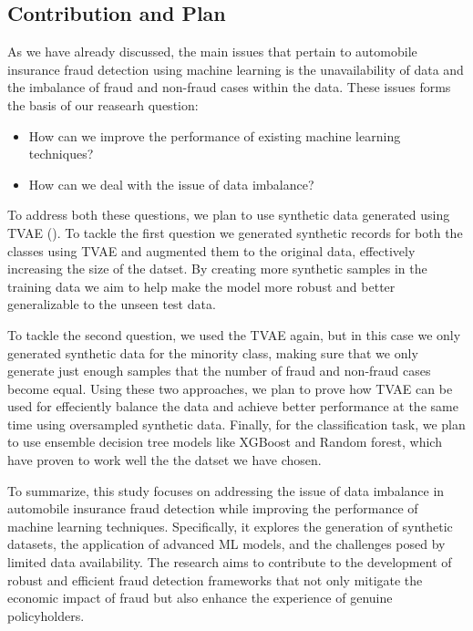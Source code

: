 \documentclass[twoside,11pt]{article}
\begin{document}
\subsection{Contribution and Plan}

As we have already discussed, the main issues that pertain to automobile insurance fraud detection using machine learning is the unavailability of data and the imbalance of fraud and non-fraud cases within the data. These issues forms the basis of our reasearh question:

\begin{itemize}
    \item How can we improve the performance of existing machine learning techniques?
    \item How can we deal with the issue of data imbalance?
\end{itemize}

To address both these questions, we plan to use synthetic data generated using TVAE (\citealp{XuRp}). To tackle the first question we generated synthetic records for both the classes using TVAE and augmented them to the original data, effectively increasing the size of the datset. By creating more synthetic samples in the training data we aim to help make the model more robust and better generalizable to the unseen test data.

To tackle the second question, we used the TVAE again, but in this case we only generated synthetic data for the minority class, making sure that we only generate just enough samples that the number of fraud and non-fraud cases become equal. Using these two approaches, we plan to prove how TVAE can be used for effeciently balance the data and achieve better performance at the same time using oversampled synthetic data. Finally, for the classification task, we plan to use ensemble decision tree models like XGBoost and Random forest, which have proven to work well the the datset we have chosen.

To summarize, this study focuses on addressing the issue of data imbalance in automobile insurance fraud detection while improving the performance of machine learning techniques. Specifically, it explores the generation of synthetic datasets, the application of advanced ML models, and the challenges posed by limited data availability. The research aims to contribute to the development of robust and efficient fraud detection frameworks that not only mitigate the economic impact of fraud but also enhance the experience of genuine policyholders.
\end{document}
